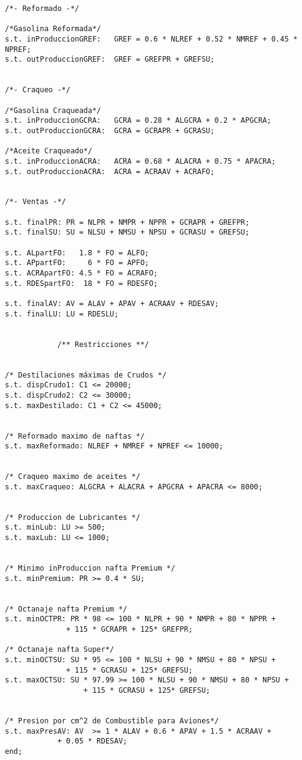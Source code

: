 \documentclass[a4paper,10pt]{article}
\begin{document}
\begin{verbatim}
/*- Reformado -*/

/*Gasolina Reformada*/
s.t. inProduccionGREF:   GREF = 0.6 * NLREF + 0.52 * NMREF + 0.45 * NPREF;
s.t. outProduccionGREF:  GREF = GREFPR + GREFSU;


/*- Craqueo -*/

/*Gasolina Craqueada*/
s.t. inProduccionGCRA:   GCRA = 0.28 * ALGCRA + 0.2 * APGCRA;
s.t. outProduccionGCRA:  GCRA = GCRAPR + GCRASU;

/*Aceite Craqueado*/
s.t. inProduccionACRA:   ACRA = 0.68 * ALACRA + 0.75 * APACRA;
s.t. outProduccionACRA:  ACRA = ACRAAV + ACRAFO;


/*- Ventas -*/

s.t. finalPR: PR = NLPR + NMPR + NPPR + GCRAPR + GREFPR;
s.t. finalSU: SU = NLSU + NMSU + NPSU + GCRASU + GREFSU;

s.t. ALpartFO: 	 1.8 * FO = ALFO;
s.t. APpartFO: 	   6 * FO = APFO;
s.t. ACRApartFO: 4.5 * FO = ACRAFO;
s.t. RDESpartFO:  18 * FO = RDESFO;

s.t. finalAV: AV = ALAV + APAV + ACRAAV + RDESAV;
s.t. finalLU: LU = RDESLU;


			/** Restricciones **/

			
/* Destilaciones máximas de Crudos */
s.t. dispCrudo1: C1 <= 20000;
s.t. dispCrudo2: C2 <= 30000;
s.t. maxDestilado: C1 + C2 <= 45000;


/* Reformado maximo de naftas */
s.t. maxReformado: NLREF + NMREF + NPREF <= 10000;


/* Craqueo maximo de aceites */
s.t. maxCraqueo: ALGCRA + ALACRA + APGCRA + APACRA <= 8000;


/* Produccion de Lubricantes */
s.t. minLub: LU >= 500;
s.t. maxLub: LU <= 1000;


/* Minimo inProduccion nafta Premium */
s.t. minPremium: PR >= 0.4 * SU;


/* Octanaje nafta Premium */
s.t. minOCTPR: PR * 98 <= 100 * NLPR + 90 * NMPR + 80 * NPPR +
			  + 115 * GCRAPR + 125* GREFPR;

/* Octanaje nafta Super*/
s.t. minOCTSU: SU * 95 <= 100 * NLSU + 90 * NMSU + 80 * NPSU +
			  + 115 * GCRASU + 125* GREFSU;
s.t. maxOCTSU: SU * 97.99 >= 100 * NLSU + 90 * NMSU + 80 * NPSU +
			      + 115 * GCRASU + 125* GREFSU;

			      
/* Presion por cm^2 de Combustible para Aviones*/
s.t. maxPresAV: AV  >= 1 * ALAV + 0.6 * APAV + 1.5 * ACRAAV +
			+ 0.05 * RDESAV;
end;
\end{verbatim}

 \newpage
\end{document}
